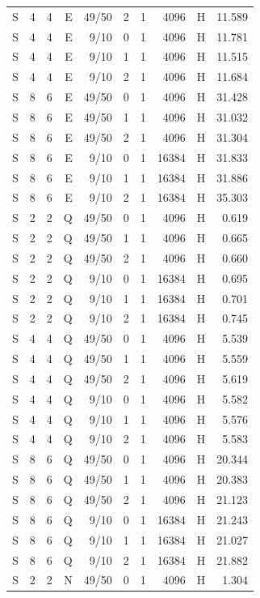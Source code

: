 \begin{longtable}{rrrrrrrrrr}
S & 4 & 4 & E & 49/50 & 2 & 1 & 4096 & H & 11.589 \\
S & 4 & 4 & E & 9/10 & 0 & 1 & 4096 & H & 11.781 \\
S & 4 & 4 & E & 9/10 & 1 & 1 & 4096 & H & 11.515 \\
S & 4 & 4 & E & 9/10 & 2 & 1 & 4096 & H & 11.684 \\
S & 8 & 6 & E & 49/50 & 0 & 1 & 4096 & H & 31.428 \\
S & 8 & 6 & E & 49/50 & 1 & 1 & 4096 & H & 31.032 \\
S & 8 & 6 & E & 49/50 & 2 & 1 & 4096 & H & 31.304 \\
S & 8 & 6 & E & 9/10 & 0 & 1 & 16384 & H & 31.833 \\
S & 8 & 6 & E & 9/10 & 1 & 1 & 16384 & H & 31.886 \\
S & 8 & 6 & E & 9/10 & 2 & 1 & 16384 & H & 35.303 \\
S & 2 & 2 & Q & 49/50 & 0 & 1 & 4096 & H & 0.619 \\
S & 2 & 2 & Q & 49/50 & 1 & 1 & 4096 & H & 0.665 \\
S & 2 & 2 & Q & 49/50 & 2 & 1 & 4096 & H & 0.660 \\
S & 2 & 2 & Q & 9/10 & 0 & 1 & 16384 & H & 0.695 \\
S & 2 & 2 & Q & 9/10 & 1 & 1 & 16384 & H & 0.701 \\
S & 2 & 2 & Q & 9/10 & 2 & 1 & 16384 & H & 0.745 \\
S & 4 & 4 & Q & 49/50 & 0 & 1 & 4096 & H & 5.539 \\
S & 4 & 4 & Q & 49/50 & 1 & 1 & 4096 & H & 5.559 \\
S & 4 & 4 & Q & 49/50 & 2 & 1 & 4096 & H & 5.619 \\
S & 4 & 4 & Q & 9/10 & 0 & 1 & 4096 & H & 5.582 \\
S & 4 & 4 & Q & 9/10 & 1 & 1 & 4096 & H & 5.576 \\
S & 4 & 4 & Q & 9/10 & 2 & 1 & 4096 & H & 5.583 \\
S & 8 & 6 & Q & 49/50 & 0 & 1 & 4096 & H & 20.344 \\
S & 8 & 6 & Q & 49/50 & 1 & 1 & 4096 & H & 20.383 \\
S & 8 & 6 & Q & 49/50 & 2 & 1 & 4096 & H & 21.123 \\
S & 8 & 6 & Q & 9/10 & 0 & 1 & 16384 & H & 21.243 \\
S & 8 & 6 & Q & 9/10 & 1 & 1 & 16384 & H & 21.027 \\
S & 8 & 6 & Q & 9/10 & 2 & 1 & 16384 & H & 21.882 \\
S & 2 & 2 & N & 49/50 & 0 & 1 & 4096 & H & 1.304 \\

\end{longtable}
